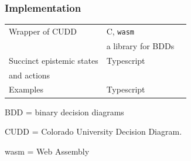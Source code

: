 \begin{frame}
	\frametitle{Implementation}

\begin{center}
	\begin{tabular}{lll}
		Wrapper of CUDD & C, \texttt{wasm} \\
		 & a library for BDDs & \\[2mm] \hline
		 
		 Succinct epistemic states & Typescript \\
		    and actions  &  \\[2mm]  \hline
		 
		  Examples & Typescript
		 
	\end{tabular}
	\end{center}
	
	
\vfill
\hfill
	\begin{minipage}{7cm}
		\small
	BDD = binary decision diagrams
	
	CUDD = Colorado University Decision Diagram.
	
	wasm = Web Assembly
	\end{minipage}
\end{frame}






